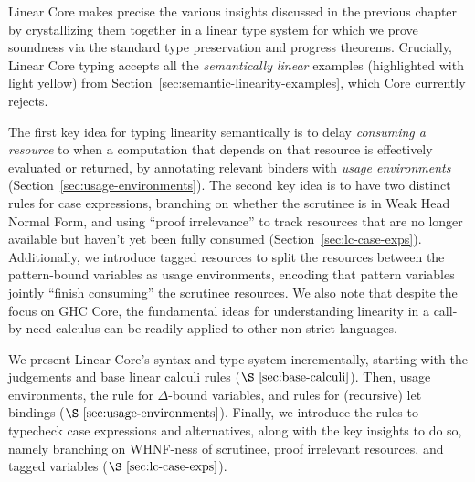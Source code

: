 \documentclass[acmsmall,review,anonymous]{acmart}
\newcommand{\notyetcolorname}{light yellow}
\begin{document}
Linear Core makes precise the various insights discussed in the
previous chapter by crystallizing them together in a linear type system for which we
prove soundness via the standard type preservation and progress theorems. Crucially,
Linear Core typing accepts all the \emph{semantically linear} examples
(highlighted with \colorbox{notyet}{\notyetcolorname})
from Section~\ref{sec:semantic-linearity-examples}, which Core currently
rejects.
%

The first key idea for typing linearity semantically is to delay \emph{consuming a
resource} to when a computation that depends on that resource is effectively
evaluated or returned, by annotating relevant binders with \emph{usage
environments} (Section~\ref{sec:usage-environments}).
%
The second key idea is to have two distinct rules for case
expressions, branching on whether the scrutinee is in Weak Head Normal
Form, and using ``proof irrelevance'' to track resources that are no
longer available but haven't yet been fully consumed
(Section~\ref{sec:lc-case-exps}). Additionally, we introduce tagged
resources to split the resources between the pattern-bound variables
as usage environments, encoding that pattern variables jointly
``finish consuming'' the scrutinee resources.
% 
We also note that despite the focus on GHC Core, the fundamental ideas for
understanding linearity in a call-by-need calculus can be readily applied to
other non-strict languages.

We present Linear Core's syntax and type system incrementally, starting with the
judgements and base linear calculi rules ($\S~\ref{sec:base-calculi}$).
%
Then, usage environments, the rule for $\Delta$-bound variables, and rules for
(recursive) let bindings ($\S~\ref{sec:usage-environments}$).
%
Finally, we introduce the rules to typecheck case expressions and alternatives,
along with the key insights to do so, namely branching on WHNF-ness of
scrutinee, proof irrelevant resources, and tagged variables
($\S~\ref{sec:lc-case-exps}$).

%
\end{document}
